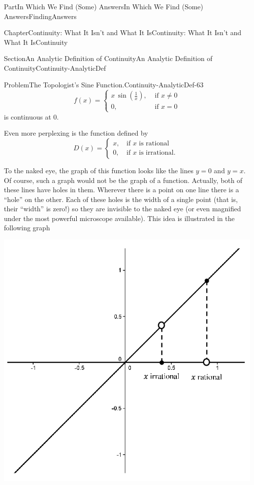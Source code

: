 \documentclass[oneside,10pt,]{book}
\numberwithin{equation}{part}
\newcommand{\amp}{&}
\begin{document}
\begin{partptx}{Part}{In Which We Find (Some) Answers}{}{In Which We Find (Some) Answers}{}{}{FindingAnswers}
\begin{chapterptx}{Chapter}{Continuity: What It Isn't and What It Is}{}{Continuity: What It Isn't and What It Is}{}{}{Continuity}
\begin{sectionptx}{Section}{An Analytic Definition of Continuity}{}{An Analytic Definition of Continuity}{}{}{Continuity-AnalyticDef}
\begin{problem}{Problem}{The Topologist's Sine Function.}{Continuity-AnalyticDef-63}
\begin{equation*}
f(x)= \begin{cases}
x\,\sin\left(\frac{1}{x}\right),\amp \text{ if } x\neq 0\\ 
0, \amp \text{ if } x=0 
\end{cases}
\end{equation*}
is continuous at \(0\).%
\end{problem}
Even more perplexing is the function defined by%
\begin{equation*}
D(x)=
\left\{ 
\begin{matrix}
x\text{,} \amp \text{ if } x\text{ is rational } \\
0\text{,} \amp \text{ if } x\text{ is irrational. } 
\end{matrix}
\right.
\end{equation*}
\par
To the naked eye, the graph of this function looks like the lines \(y=0\) and \(y=x\).  Of course, such a graph would not be the graph of a function.  Actually, both of these lines have holes in them.  Wherever there is a point on one line there is a ``hole'' on the other.  Each of these holes is the width of a single point (that is, their ``width'' is zero!) so they are invisible to the naked eye (or even magnified under the most powerful microscope available).  This idea is illustrated in the following graph%
\begin{image}{0.2}{0.6}{0.2}{}%
\includegraphics[width=\linewidth]{external/images/Ch5fig5.png}

\end{image}
\end{sectionptx}
\end{chapterptx}
\end{partptx}
\end{document}
